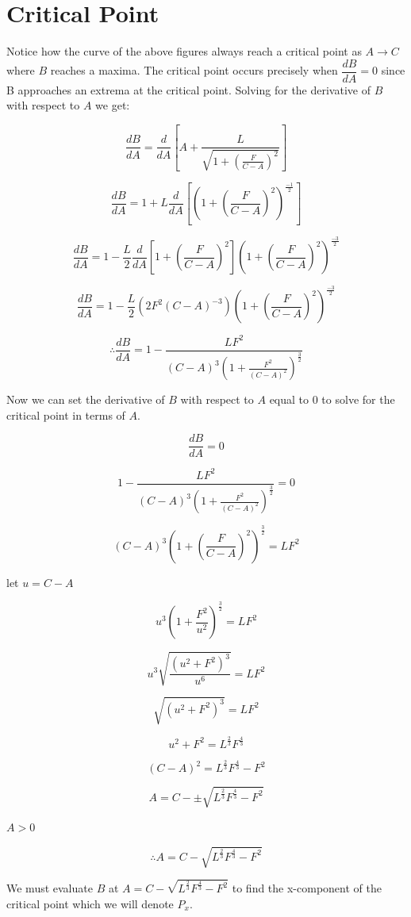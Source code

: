 \documentclass{article}
\begin{document}
\section{Critical Point}
Notice how the curve of the above figures always reach a critical point as $A \to C$ where $B$ reaches a maxima. The critical point occurs precisely when $\dfrac{dB}{dA} = 0$ since B approaches an extrema at the critical point. Solving for the derivative of $B$ with respect to $A$ we get:

$$\dfrac{dB}{dA} = \frac{d}{dA} \left[A+ \frac{L}{\sqrt{1+\left(\frac{F}{C-A}\right)^2}}\right]$$

$$\dfrac{dB}{dA} = 1+L\frac{d}{dA}\left[\left( 1+\left(\frac{F}{C-A}\right)^2\right)^{\tfrac{-1}{2}}\right]$$

$$\dfrac{dB}{dA} = 1-\frac{L}{2}\frac{d}{dA}\left[1+\left(\frac{F}{C-A}\right)^2\right]\left(1+\left(\frac{F}{C-A}\right)^2\right)^{\tfrac{-3}{2}}$$

$$\dfrac{dB}{dA} = 1-\frac{L}{2}\left(2F^2\left(C-A\right)^{-3}\right)\left(1+\left(\frac{F}{C-A}\right)^2\right)^{\tfrac{-3}{2}}$$

$$\therefore \boxed{\dfrac{dB}{dA} = 1- \frac{LF^2}{\left(C-A\right)^3\left(1+\frac{F^2}{(C-A)^2}\right)^{\tfrac{3}{2}}}}$$

Now we can set the derivative of $B$ with respect to $A$ equal to 0 to solve for the critical point in terms of $A$.

$$\dfrac{dB}{dA} = 0$$

$$1- \frac{LF^2}{\left(C-A\right)^3\left(1+\frac{F^2}{(C-A)^2}\right)^{\tfrac{3}{2}}} = 0$$

$$(C-A)^3\left(1+\left(\frac{F}{C-A}\right)^2\right)^{\tfrac{3}{2}} = LF^2$$

let $u=C-A$

$$u^3\left(1+\frac{F^2}{u^2}\right)^{\frac{3}{2}} = LF^2$$

$$u^3\sqrt{\frac{\left(u^2+F^2\right)^3}{u^6}} = LF^2$$

$$\sqrt{\left(u^2+F^2\right)^3} = LF^2$$

$$u^2+F^2=L^{\frac{2}{3}}F^{\frac{4}{3}}$$

$$(C-A)^2 = L^{\frac{2}{3}}F^{\frac{4}{3}}-F^2$$

$$A=C - \pm \sqrt{L^{\frac{2}{3}}F^{\frac{4}{3}}-F^2}$$

$A>0$

$$\therefore \boxed{A=C - \sqrt{L^{\frac{2}{3}}F^{\frac{4}{3}}-F^2}}$$

We must evaluate $B$ at $A=C - \sqrt{L^{\frac{2}{3}}F^{\frac{4}{3}}-F^2}$ to find the x-component of the critical point which we will denote $P_x$.
\end{document}
